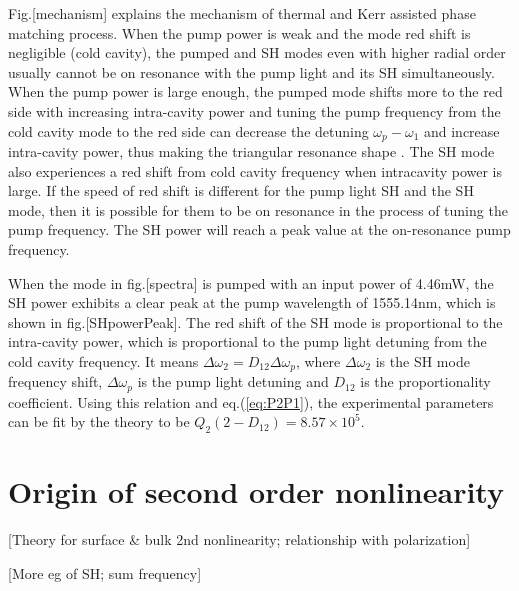 \documentclass[a4paper,12pt,hyperref]{article}
\begin{document}
Fig.[mechanism] explains the mechanism of thermal and Kerr assisted phase matching process. When the pump power is weak and the mode red shift is negligible (cold cavity), the pumped and SH modes even with higher radial order usually cannot be on resonance with the pump light and its SH simultaneously. When the pump power is large enough, the pumped mode shifts more to the red side with increasing intra-cavity power and tuning the pump frequency from the cold cavity mode to the red side can decrease the detuning $\omega_p-\omega_1$ and increase intra-cavity power, thus making the triangular resonance shape \cite{carmon2004dynamical}. The SH mode also experiences a red shift from cold cavity frequency when intracavity power is large. If the speed of red shift is different for the pump light SH and the SH mode, then it is possible for them to be on resonance in the process of tuning the pump frequency. The SH power will reach a peak value at the on-resonance pump frequency. 

When the mode in fig.[spectra] is pumped with an input power of 4.46mW, the SH power exhibits a clear peak at the pump wavelength of 1555.14nm, which is shown in fig.[SHpowerPeak]. The red shift of the SH mode is proportional to the intra-cavity power, which is proportional to the pump light detuning from the cold cavity frequency. It means $\Delta \omega_2 = D_{12}\Delta \omega_p$, where $\Delta \omega_2$ is the SH mode frequency shift, $\Delta \omega_p$ is the pump light detuning and $D_{12}$ is the proportionality coefficient. Using this relation and eq.(\ref{eq:P2P1}), the experimental parameters can be fit by the theory to be $Q_2(2-D_{12})=8.57\times 10^5$.



\section{Origin of second order nonlinearity}
[Theory for surface \& bulk 2nd nonlinearity; relationship with polarization]

[More eg of SH; sum frequency]






\end{document}
